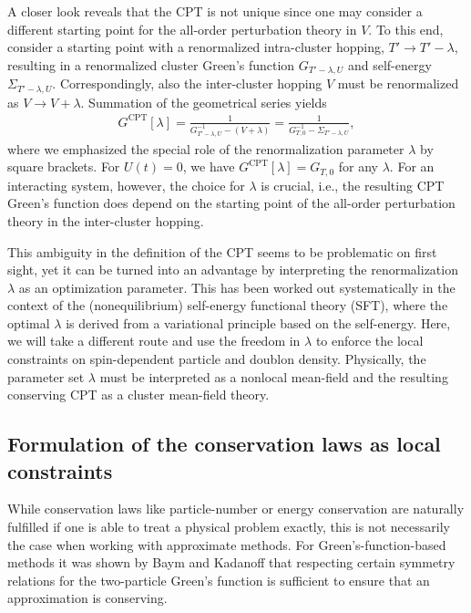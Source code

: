 \documentclass[twocolumn,prb,showpacs,aps,superscriptaddress]{revtex4}
\begin{document}
A closer look reveals that the CPT is not unique since one may consider a
different starting point for the all-order perturbation theory in $V$. To this
end, consider a starting point with a renormalized intra-cluster hopping, $T'
\rightarrow T' - \lambda$, resulting in a renormalized cluster Green's function
$G_{T' - \lambda, U}$ and self-energy $\Sigma_{T' - \lambda, U}$.
Correspondingly, also the inter-cluster hopping $V$ must be renormalized as $V
\rightarrow V + \lambda$. Summation of the geometrical series yields
\begin{align}
  \label{eq:cptlambda}
  G^\mathrm{CPT}[\lambda]
  = 
  \frac{1}{G_{T'-\lambda, U}^{-1}-(V+\lambda)}
  = 
  \frac{1}{G_{T,0}^{-1}-\Sigma_{T' - \lambda, U}},
\end{align}
where we emphasized the special role of the renormalization parameter $\lambda$
by square brackets. For $U(t) = 0$, we have $G^\text{CPT}[\lambda] =
G_{T,0}$ for any $\lambda$. For an interacting system, however, the choice
for $\lambda$ is crucial, i.e., the resulting CPT Green's function does depend
on the starting point of the all-order perturbation theory in the inter-cluster
hopping. 

This ambiguity in the definition of the CPT seems to be problematic on first
sight, yet it can be turned into an advantage by interpreting the
renormalization $\lambda$ as an optimization parameter.  This has been worked
out systematically in the context of the (nonequilibrium) self-energy
functional theory (SFT), \cite{HEAP13,HEP16a,HEP16b,HP16} where the optimal
$\lambda$ is derived from a variational principle based on the self-energy.
Here, we will take a different route and use the freedom in $\lambda$ to enforce the local constraints on spin-dependent particle and doublon density. 
Physically, the parameter set $\lambda$ must be interpreted as a nonlocal mean-field and the resulting conserving CPT as a cluster mean-field theory.

\subsection{Formulation of the conservation laws as local constraints}
\label{sec:con_eqs}

While conservation laws like particle-number or energy conservation are
naturally fulfilled if one is able to treat a physical problem exactly, this is
not necessarily the case when working with approximate methods. For
Green's-function-based methods it was shown by Baym and Kadanoff
\cite{BK61,Bay62} that respecting certain symmetry relations for the
two-particle Green's function is sufficient to ensure that an approximation is
conserving. 
\end{document}
